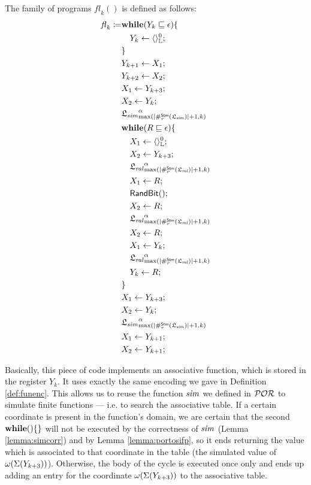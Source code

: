 \begin{defn}
  \label{def:flpseudo}
  The family of programs $\mathit{fl}_k()$ is defined as follows:
  \begin{align*}
  \mathit{fl}_k\coloneqq& \mathbf{while}(Y_k\sqsubseteq\epsilon)\{\\
  &\quad Y_k \leftarrow \langle{}\rangle^{0}_{\mathbb{L}};\\
  &\}\\
  &Y_{k+1}\leftarrow X_1;\\
  &Y_{k+2}\leftarrow X_2;\\
  &X_1\leftarrow Y_{k+3};\\
  &X_2\leftarrow Y_{k};\\
  &{\mathfrak L_{\mathit{sim}}}^\alpha_{\max (|\#_r^{\mathsf{Stm}}({\mathfrak L_{\mathit{sim}}})|+1,k)}\\
  &\mathbf{while}(R \sqsubseteq \epsilon)\{\\
  &\quad X_1 \leftarrow \langle{}\rangle^{0}_{\mathbb{L}};\\
  &\quad X_2 \leftarrow Y_{k+3};\\
  &\quad{\mathfrak L_{\mathit{ral}}}^\alpha_{\max (|\#_r^{\mathsf{Stm}}({\mathfrak L_{\mathit{ral}}})|+1,k)}\\
  &\quad X_1\leftarrow R;\\
  &\quad \mathsf{RandBit()};\\
  &\quad X_2 \leftarrow R;\\
  &\quad{\mathfrak L_{\mathit{ral}}}^\alpha_{\max (|\#_r^{\mathsf{Stm}}({\mathfrak L_{\mathit{ral}}})|+1,k)}\\
  &\quad X_2 \leftarrow R;\\
  &\quad X_1 \leftarrow Y_k;\\
  &\quad{\mathfrak L_{\mathit{ral}}}^\alpha_{\max (|\#_r^{\mathsf{Stm}}({\mathfrak L_{\mathit{ral}}})|+1,k)}\\
  &\quad Y_k \leftarrow R;\\
  &\}\\
  & X_1 \leftarrow Y_{k+3};\\
  & X_2 \leftarrow Y_k;\\
  &{\mathfrak L_{\mathit{sim}}}^\alpha_{\max (|\#_r^{\mathsf{Stm}}({\mathfrak L_{\mathit{sim}}})|+1,k)}\\
  & X_1 \leftarrow Y_{k+1};\\
  & X_2 \leftarrow Y_{k+1};
  \end{align*}
\end{defn}

Basically, this piece of code implements an associative function, which is stored
in the register $Y_k$. It uses exactly the same encoding we gave in
Definition \ref{def:funenc}.
This allows us to reuse the function $\mathit{sim}$
we defined in $\mathcal{POR}$ to simulate finite functions --- i.e. to search the associative table.
If a certain coordinate is present in the function's domain, we are certain that
the second $\mathbf{while}()\{\}$ will not be executed by the correctness
of $\mathit{sim}$ (Lemma \ref{lemma:simcorr}) and by Lemma \ref{lemma:portosifp},
so it ends returning the value which is associated to that coordinate in the table
(the simulated value of $\omega (\Sigma(Y_{k+3}))$). Otherwise, the body of the
cycle is executed once only and ends up adding an entry for the coordinate
$\omega (\Sigma(Y_{k+3}))$ to the associative table.

